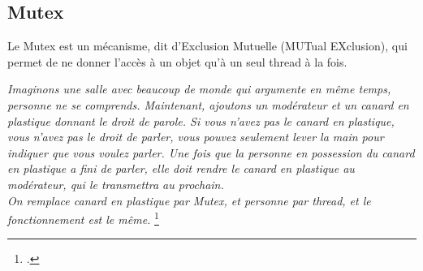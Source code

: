 \subsection{Mutex}
Le Mutex est un mécanisme, dit d'Exclusion Mutuelle (MUTual EXclusion), qui
permet de ne donner l'accès à un objet qu'à un seul thread à la fois.

\emph{Imaginons une salle avec beaucoup de monde qui argumente en même temps, personne
ne se comprends. Maintenant, ajoutons un modérateur et 
un canard en plastique donnant le droit de parole. 
Si vous n'avez pas le canard en plastique, vous n'avez pas le droit de parler,
vous pouvez seulement lever la main pour indiquer que vous voulez parler.
Une fois que la personne en possession du canard en plastique a fini de parler,
elle doit rendre le canard en plastique au modérateur,
qui le transmettra au prochain.}\\
\emph{On remplace canard en plastique par Mutex, et personne par thread, et le fonctionnement est le même.} \footcite{mutex}